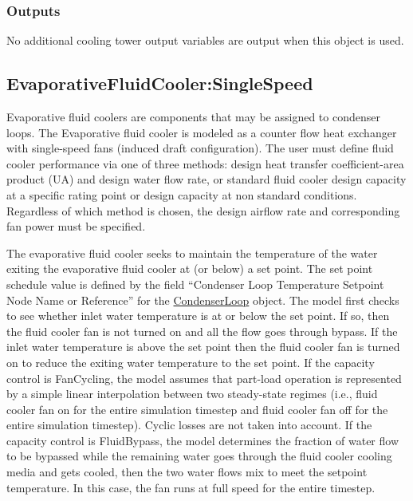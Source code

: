 \subsubsection{Outputs}\label{outputs-5-001}

No additional cooling tower output variables are output when this object is used.

\subsection{EvaporativeFluidCooler:SingleSpeed}\label{evaporativefluidcoolersinglespeed}

Evaporative fluid coolers are components that may be assigned to condenser loops. The Evaporative fluid cooler is modeled as a counter flow heat exchanger with single-speed fans (induced draft configuration). The user must define fluid cooler performance via one of three methods: design heat transfer coefficient-area product (UA) and design water flow rate, or standard fluid cooler design capacity at a specific rating point or design capacity at non standard conditions. Regardless of which method is chosen, the design airflow rate and corresponding fan power must be specified.

The evaporative fluid cooler seeks to maintain the temperature of the water exiting the evaporative fluid cooler at (or below) a set point. The set point schedule value is defined by the field ``Condenser Loop Temperature Setpoint Node Name or Reference'' for the \hyperref[condenserloop]{CondenserLoop} object. The model first checks to see whether inlet water temperature is at or below the set point. If so, then the fluid cooler fan is not turned on and all the flow goes through bypass. If the inlet water temperature is above the set point then the fluid cooler fan is turned on to reduce the exiting water temperature to the set point. If the capacity control is FanCycling, the model assumes that part-load operation is represented by a simple linear interpolation between two steady-state regimes (i.e., fluid cooler fan on for the entire simulation timestep and fluid cooler fan off for the entire simulation timestep). Cyclic losses are not taken into account. If the capacity control is FluidBypass, the model determines the fraction of water flow to be bypassed while the remaining water goes through the fluid cooler cooling media and gets cooled, then the two water flows mix to meet the setpoint temperature. In this case, the fan runs at full speed for the entire timestep.

